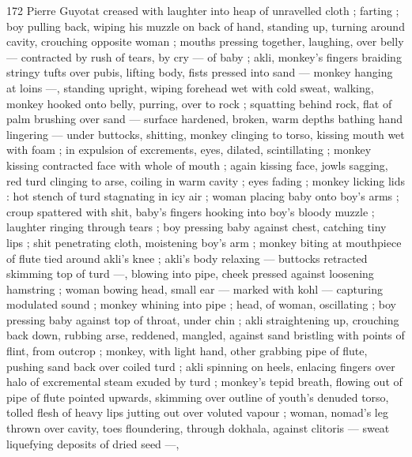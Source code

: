 172 Pierre Guyotat
creased with laughter into heap of unravelled cloth ; farting ; boy
pulling back, wiping his muzzle on back of hand, standing up, turning
around cavity, crouching opposite woman ; mouths pressing together,
laughing, over belly — contracted by rush of tears, by cry — of
baby ; akli, monkey's fingers braiding stringy tufts over pubis, lifting
body, fists pressed into sand — monkey hanging at loins —,
standing upright, wiping forehead wet with cold sweat, walking,
monkey hooked onto belly, purring, over to rock ; squatting behind
rock, flat of palm brushing over sand — surface hardened, broken,
warm depths bathing hand lingering — under buttocks, shitting,
monkey clinging to torso, kissing mouth wet with foam ; in expulsion
of excrements, eyes, dilated, scintillating ; monkey kissing
contracted face with whole of mouth ; again kissing face, jowls
sagging, red turd clinging to arse, coiling in warm cavity ; eyes fading
; monkey licking lids : hot stench of turd stagnating in icy air ; woman
placing baby onto boy's arms ; croup spattered with shit, baby's
fingers hooking into boy's bloody muzzle ; laughter ringing through
tears ; boy pressing baby against chest, catching tiny lips ; shit
penetrating cloth, moistening boy’s arm ; monkey biting at
mouthpiece of flute tied around akli’s knee ; akli's body relaxing —
buttocks retracted skimming top of turd —, blowing into pipe, cheek
pressed against loosening hamstring ; woman bowing head, small ear
— marked with kohl — capturing modulated sound ; monkey
whining into pipe ; head, of woman, oscillating ; boy pressing baby
against top of throat, under chin ; akli straightening up, crouching
back down, rubbing arse, reddened, mangled, against sand bristling
with points of flint, from outcrop ; monkey, with light hand, other
grabbing pipe of flute, pushing sand back over coiled turd ; akli
spinning on heels, enlacing fingers over halo of excremental steam
exuded by turd ; monkey's tepid breath, flowing out of pipe of flute
pointed upwards, skimming over outline of youth's denuded torso,
tolled flesh of heavy lips jutting out over voluted vapour ; woman,
nomad’s leg thrown over cavity, toes floundering, through dokhala,
against clitoris — sweat liquefying deposits of dried seed —,

